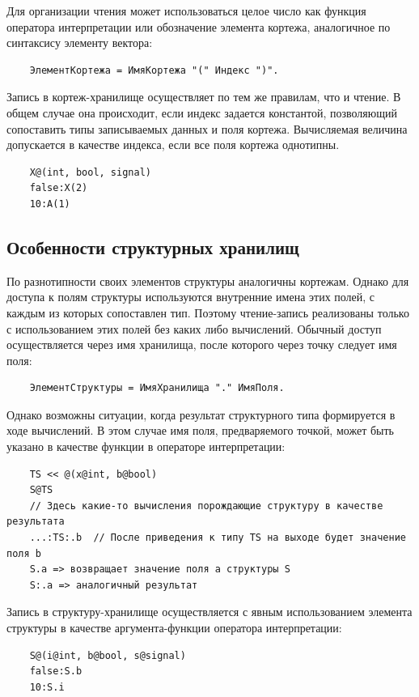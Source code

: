 Для организации чтения может использоваться целое число как функция оператора интерпретации или обозначение элемента кортежа, аналогичное по синтаксису элементу вектора:
\begin{verbatim}
    ЭлементКортежа = ИмяКортежа "(" Индекс ")".
\end{verbatim}

Запись в кортеж-хранилище осуществляет по тем же правилам, что и чтение. В общем случае она происходит, если индекс задается константой, позволяющий сопоставить типы записываемых данных и поля кортежа. Вычисляемая величина допускается в качестве индекса, если все поля кортежа однотипны.
\begin{verbatim}
    X@(int, bool, signal)
    false:X(2)
    10:A(1)
\end{verbatim}

\subsection{Особенности структурных хранилищ}

По разнотипности своих элементов структуры аналогичны кортежам. Однако для доступа к полям структуры используются внутренние имена этих полей, с каждым из которых сопоставлен тип. Поэтому чтение-запись реализованы только с использованием этих полей без каких либо вычислений. Обычный доступ осуществляется через имя хранилища, после которого через точку следует имя поля:
\begin{verbatim}
    ЭлементСтруктуры = ИмяХранилища "." ИмяПоля.
\end{verbatim}

Однако возможны ситуации, когда результат структурного типа формируется в ходе вычислений. В этом случае имя поля, предваряемого точкой, может быть указано в качестве функции в операторе интерпретации:
\begin{verbatim}
    TS << @(x@int, b@bool)
    S@TS
    // Здесь какие-то вычисления порождающие структуру в качестве результата
    ...:TS:.b  // После приведения к типу TS на выходе будет значение поля b
    S.a => возвращает значение поля a структуры S
    S:.a => аналогичный результат
\end{verbatim}

Запись в структуру-хранилище осуществляется с явным использованием элемента структуры в качестве аргумента-функции оператора интерпретации:
\begin{verbatim}
    S@(i@int, b@bool, s@signal)
    false:S.b
    10:S.i
\end{verbatim}

